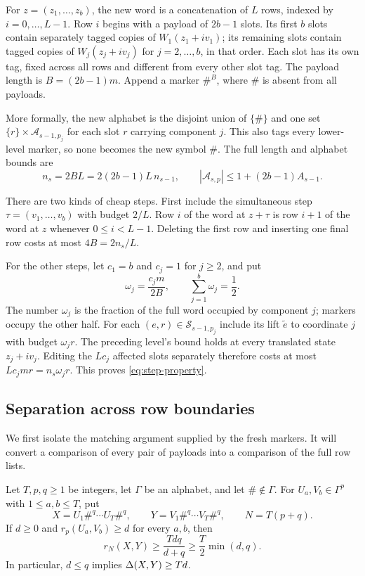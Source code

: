 For $z=(z_1,\ldots,z_b)$, the new word is a concatenation of $L$ rows,
indexed by $i=0,\ldots,L-1$. Row $i$ begins with a payload of $2b-1$
slots. Its first $b$ slots contain separately tagged copies of
$W_1(z_1+iv_1)$; its remaining slots contain tagged copies of
$W_j(z_j+iv_j)$ for $j=2,\ldots,b$, in that order. Each slot has its
own tag, fixed across all rows and different from every other slot tag.
The payload length is
$B=(2b-1)m$. Append a marker $\#^B$, where $\#$ is absent from all
payloads.

More formally, the new alphabet is the disjoint union of $\{\#\}$ and
one set $\{r\}\times\mathcal A_{s-1,p_j}$ for each slot $r$ carrying
component $j$. This also tags every lower-level marker, so none becomes
the new symbol $\#$. The full length and alphabet bounds are
\begin{equation}\label{eq:row-length}
 n_s=2BL=2(2b-1)L\,n_{s-1},
 \qquad |\mathcal A_{s,p}|\le1+(2b-1)A_{s-1}.
\end{equation}

There are two kinds of cheap steps. First include the simultaneous
step $\tau=(v_1,\ldots,v_b)$ with budget $2/L$. Row $i$ of the word at
$z+\tau$ is row $i+1$ of the word at $z$ whenever $0\le i<L-1$.
Deleting the first row and inserting one final row costs at most
$4B=2n_s/L$.

For the other steps, let $c_1=b$ and $c_j=1$ for $j\ge2$, and put
\begin{equation}\label{eq:weights}
 \omega_j=\frac{c_jm}{2B},\qquad \sum_{j=1}^b\omega_j=\frac12.
\end{equation}
The number $\omega_j$ is the fraction of the full word occupied by
component $j$; markers occupy the other half. For each
$(e,r)\in\mathcal S_{s-1,p_j}$ include its lift $\widetilde e$ to
coordinate $j$ with budget $\omega_jr$. The preceding level's bound
holds at every translated state $z_j+iv_j$. Editing the $Lc_j$ affected
slots separately therefore costs at most
$Lc_jmr=n_s\omega_jr$. This proves \eqref{eq:step-property}.

\subsection{Separation across row boundaries}\label{sec:separation}

We first isolate the matching argument supplied by the fresh markers.
It will convert a comparison of every pair of payloads into a comparison
of the full row lists.

\begin{lemma}\label{lem:marked}
Let $T,p,q\ge1$ be integers, let $\Gamma$ be an alphabet, and let
$\#\notin\Gamma$. For $U_a,V_b\in\Gamma^p$ with $1\le a,b\le T$, put
\[
 X=U_1\#^q\cdots U_T\#^q,\qquad
 Y=V_1\#^q\cdots V_T\#^q,\qquad N=T(p+q).
\]
If $d\ge0$ and $r_p(U_a,V_b)\ge d$ for every $a,b$, then
\begin{equation}\label{eq:marked}
 r_N(X,Y)\ge\frac{Tdq}{d+q}\ge\frac T2\min(d,q).
\end{equation}
In particular, $d\le q$ implies $\Delta(X,Y)\ge Td$.
\end{lemma}

